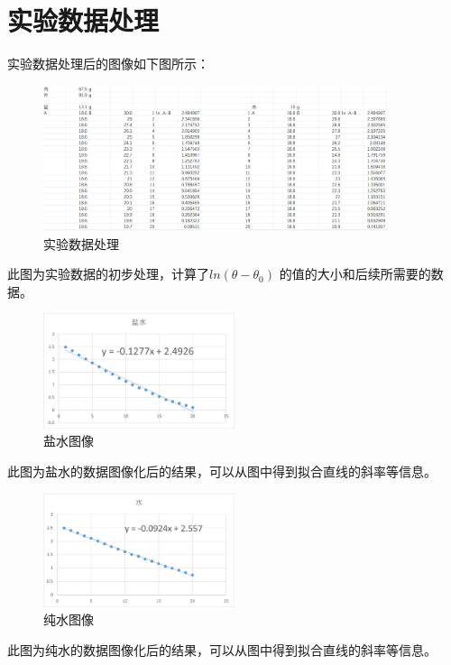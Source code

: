 \documentclass{ctexart}
\begin{document}
\section{实验数据处理}
实验数据处理后的图像如下图所示：
\begin{figure}[H]
  \centering
  \includegraphics[width=0.9\textwidth,height=0.5\textheight]{shujvchuli.png}
  \caption{实验数据处理}
\end{figure}

此图为实验数据的初步处理，计算了$ln(\theta - \theta_{0})$ 的值的大小和后续所需要的数据。

\begin{figure}[H]
  \centering
  \includegraphics[width=0.5\textwidth,height=0.2\textheight]{nacl.png}
  \caption{盐水图像}
\end{figure}

此图为盐水的数据图像化后的结果，可以从图中得到拟合直线的斜率等信息。

\begin{figure}[H]
  \centering
  \includegraphics[width=0.5\textwidth,height=0.2\textheight]{h2o.png}
  \caption{纯水图像}
\end{figure}

此图为纯水的数据图像化后的结果，可以从图中得到拟合直线的斜率等信息。
\end{document}
